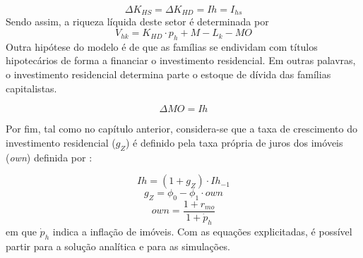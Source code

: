 \begin{equation}
    \Delta K_{HS} = \Delta K_{HD} = Ih = I_{hs}
\end{equation}
Sendo assim, a riqueza líquida deste setor é determinada por
\begin{equation}
V_{hk} = K_{HD}\cdot p_h + M - L_k - MO
\end{equation}
Outra hipótese do modelo é de que as famílias se endividam com títulos hipotecários de forma a financiar o investimento residencial. Em outras palavras, o investimento residencial determina parte o estoque de dívida das famílias capitalistas.

\begin{equation}
    \label{EqMO}
    \Delta MO = Ih
\end{equation}

Por fim, tal como no capítulo anterior, considera-se que a taxa de crescimento do investimento residencial ($g_Z$) é definido pela taxa própria de juros dos imóveis (\textit{own}) definida por \textcite{teixeira_crescimento_2015}:

\begin{equation}
    Ih = (1 + g_Z)\cdot Ih_{-1}
\end{equation}
\begin{equation}
g_Z = \phi_0 - \phi_1\cdot own
\end{equation}
\begin{equation}
own = \frac{1+r_{mo}}{1+\dot p_h}
\end{equation}
em que $\dot p_h$ indica a inflação de imóveis. 
Com as equações explicitadas, é possível partir para a solução analítica e para as simulações. 